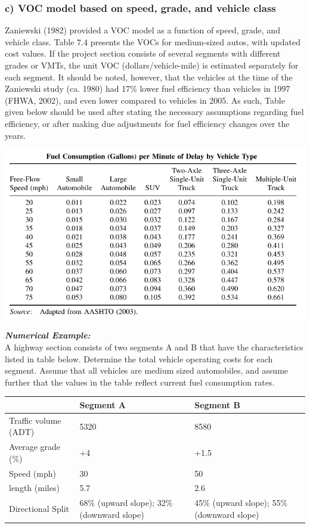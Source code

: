 \subsubsection{c) VOC model based on speed, grade, and vehicle class}
Zaniewski (1982) provided a VOC model as a function of speed, grade, and vehicle class. Table 7.4 presents the VOCs for medium-sized autos, with updated cost values. If the project section consists of several segments with different grades or VMTs, the unit VOC (dollars/vehicle-mile) is estimated separately for each segment. It should be noted, however, that the vehicles at the time of the Zaniewski study (ca. 1980) had 17\% lower fuel efficiency than vehicles in 1997 (FHWA, 2002), and even lower compared to vehicles in 2005. As such, Table given below should be used after stating the necessary assumptions regarding fuel efficiency, or after making due adjustments for fuel efficiency changes over the years.
\begin{center}
	\includegraphics[scale=0.6]{gfx/fig67.png}
\end{center}
%
\textbf{\textit{Numerical Example:}}\\
A highway section consists of two segments A and B that have the characteristics listed in table below. Determine the total vehicle operating costs for each segment. Assume that all vehicles are medium sized automobiles, and assume further that the values in the table reflect current fuel consumption rates.
\begin{center}
	\begin{tabular}{p{3.5 cm} p{3.5 cm} p{3.5 cm}}
		\hline
		 & Segment A & Segment B\\
		 \hline
		 Traffic volume (ADT) & 5320 & 8580\\
		 Average grade (\%) & +4 & +1.5\\
		 Speed (mph) & 30 & 50\\
		 length (miles) & 5.7 & 2.6\\
		 Directional Split & 68\% (upward slope); 32\% (downward slope) & 45\% (upward slope); 55\% (downward slope)\\
		 \hline
	\end{tabular}
\end{center}
